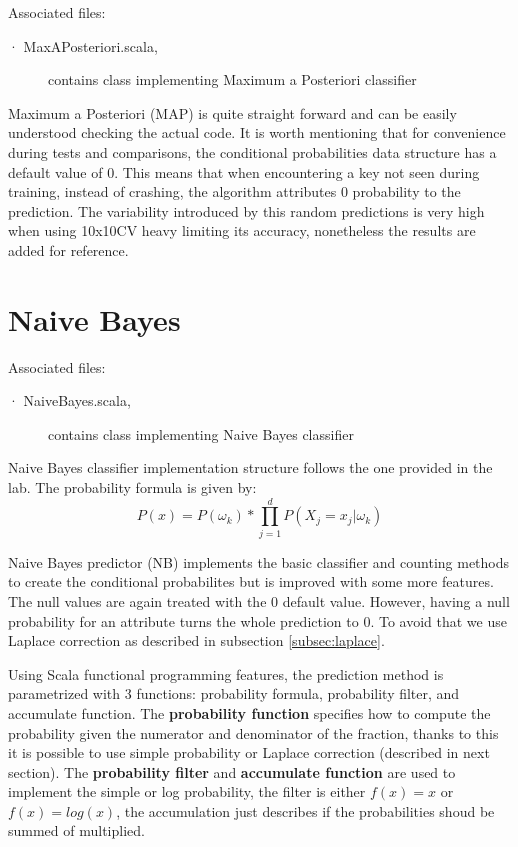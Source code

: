 \documentclass[a4paper,10pt]{article}
\begin{document}
Associated files:
\begin{description}
 \item [· MaxAPosteriori.scala,] contains class implementing Maximum a Posteriori classifier
\end{description}


Maximum a Posteriori (MAP) is quite straight forward and can be easily understood checking the actual code. It is worth mentioning that for convenience during tests and comparisons, the conditional probabilities data structure has a default value of 0. This means that when encountering a key not seen during training, instead of crashing, the algorithm attributes 0 probability to the prediction. The variability introduced by this random predictions is very high when using 10x10CV heavy limiting its accuracy, nonetheless the results are added for reference.


\section{Naive Bayes}

Associated files:
\begin{description}
 \item [· NaiveBayes.scala,] contains class implementing Naive Bayes classifier
\end{description}

  Naive Bayes classifier implementation structure follows the one provided in the lab. The probability formula is given by:
  \begin{equation}
  P(x) = P(\omega_k) * \prod_{j=1}^d P(X_j=x_j|\omega_k)
  \end{equation}

Naive Bayes predictor (NB) implements the basic classifier and counting methods to create the conditional probabilites but is improved with some more features. The null values are again treated with the 0 default value. However, having a null probability for an attribute turns the whole prediction to 0. To avoid that we use Laplace correction as described in subsection \ref{subsec:laplace}.

Using Scala functional programming features, the prediction method is parametrized with 3 functions: probability formula, probability filter, and accumulate function. The \textbf{probability function} specifies how to compute the probability given the numerator and denominator of the fraction, thanks to this it is possible to use simple probability or Laplace correction (described in next section). The \textbf{probability filter} and \textbf{accumulate function} are used to implement the simple or log probability, the filter is either $f(x) = x$ or $f(x) = log(x)$, the accumulation just describes if the probabilities shoud be summed of multiplied.
\end{document}

